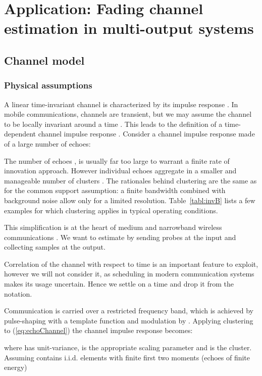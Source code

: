 \documentclass[journal,10pt]{IEEEtran}
\begin{document}
\section{Application: Fading channel estimation in multi-output systems}\label{sec:application}
\subsection{Channel model}
\subsubsection{Physical assumptions}
	A linear time-invariant channel is characterized by its impulse response . In mobile communications, channels are transient, but we may assume the channel to be locally invariant around a time . This leads to the definition of a time-dependent channel impulse response . Consider a channel impulse response made of a large number  of echoes:
	 
	The number of echoes , is usually far too large to warrant a finite rate of innovation approach. However individual echoes aggregate in a smaller and manageable number of clusters  \cite{Turin1956}. The rationales behind clustering are the same as for the common support assumption: a finite bandwidth combined with background noise allow only for a limited resolution. Table~\ref{tabl:invB} lists a few examples for which clustering applies in typical operating conditions.


	This simplification is at the heart of medium and narrowband wireless communications \cite{Molisch2005}. We want to estimate  by sending probes at the input and collecting samples at the output.
	
	 Correlation of the channel with respect to time is an important feature to exploit, however we will not consider it, as scheduling in modern communication systems makes its usage uncertain. Hence we settle on a time  and drop it from the notation.
	 
	 Communication is carried over a restricted frequency band, which is achieved by pulse-shaping with a template function  and modulation by . Applying clustering to (\ref{eq:echoChannel}) the channel impulse response becomes:
	 
	 where  has unit-variance,  is the appropriate scaling parameter and  is the  cluster. Assuming  contains i.i.d. elements with finite first two moments (echoes of finite energy)
	 
	 
	 
\end{document}
